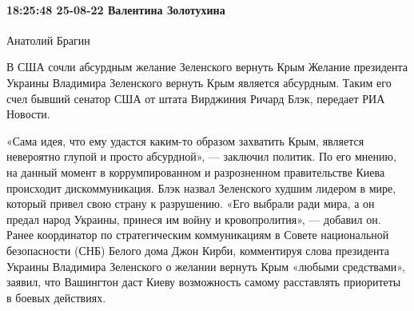  
 
 
 
 

\paragraph{18:25:48 25-08-22 Валентина Золотухина}

Анатолий Брагин

В США сочли абсурдным желание Зеленского вернуть Крым
Желание
президента Украины Владимира Зеленского вернуть Крым является
абсурдным. Таким его счел бывший сенатор США от штата Вирджиния Ричард
Блэк, передает РИА Новости. 

«Сама идея, что ему удастся каким-то образом захватить Крым, является невероятно глупой и просто абсурдной», — заключил политик.
По его мнению, на данный момент в коррумпированном и разрозненном правительстве Киева происходит дискоммуникация.
Блэк назвал Зеленского худшим лидером в мире, который привел свою страну к разрушению.
«Его выбрали ради мира, а он предал народ Украины, принеся им войну и кровопролития», — добавил он.
Ранее
координатор по стратегическим коммуникациям в Совете национальной
безопасности (СНБ) Белого дома Джон Кирби, комментируя слова президента
Украины Владимира Зеленского о желании вернуть Крым «любыми средствами»,
заявил, что Вашингтон даст Киеву возможность самому расставлять
приоритеты в боевых действиях.
